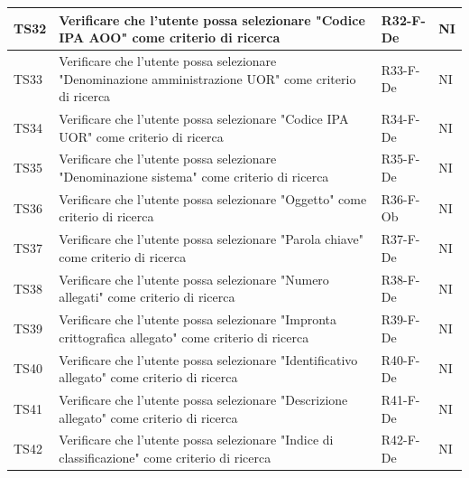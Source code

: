 \documentclass[a4paper,12pt]{article}
\begin{document}
\begin{longtable}{|M{1.2cm}|M{6.3cm}|M{2.5cm}|M{1.5cm}|}
                TS32 & Verificare che l'utente possa selezionare "Codice IPA AOO" come criterio di ricerca & R32-F-De & NI \\
                \hline

                TS33 & Verificare che l'utente possa selezionare "Denominazione amministrazione UOR" come criterio di ricerca & R33-F-De & NI \\
                \hline

                TS34 & Verificare che l'utente possa selezionare "Codice IPA UOR" come criterio di ricerca & R34-F-De & NI \\
                \hline
                
                TS35 & Verificare che l'utente possa selezionare "Denominazione sistema" come criterio di ricerca & R35-F-De & NI \\
                \hline
                
                TS36 & Verificare che l'utente possa selezionare "Oggetto" come criterio di ricerca & R36-F-Ob & NI \\
                \hline
                
                TS37 & Verificare che l'utente possa selezionare "Parola chiave" come criterio di ricerca & R37-F-De & NI \\
                \hline
                
                TS38 & Verificare che l'utente possa selezionare "Numero allegati" come criterio di ricerca & R38-F-De & NI \\
                \hline
                
                TS39 & Verificare che l'utente possa selezionare "Impronta crittografica allegato" come criterio di ricerca & R39-F-De & NI \\
                \hline
                
                TS40 & Verificare che l'utente possa selezionare "Identificativo allegato" come criterio di ricerca & R40-F-De & NI \\
                \hline
                
                TS41 & Verificare che l'utente possa selezionare "Descrizione allegato" come criterio di ricerca & R41-F-De & NI \\
                \hline
                
                TS42 & Verificare che l'utente possa selezionare "Indice di classificazione" come criterio di ricerca & R42-F-De & NI \\
                \hline
                

\end{longtable}
\end{document}
